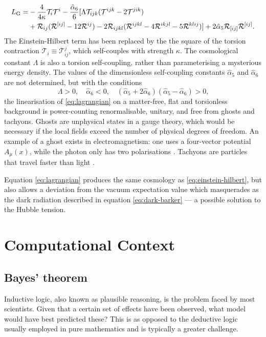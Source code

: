 \documentclass{article}
\begin{document}
\begin{equation}\begin{aligned}
  \label{eq:lagrangian}
  L_\textrm G = & -\frac{4}{4\kappa}\mathcal T_i\mathcal T^i - \frac{\hat{\alpha}_6}{6} [\Lambda\mathcal T_{ijk}(\mathcal T^{ijk}-2\mathcal T^{jik}) \\ & + \mathcal R_{ij}(\mathcal R ^{[ij]}-12\mathcal R^{ij}) - 2\mathcal R_{ijkl}(\mathcal R ^{ijkl}-4\mathcal R^{ikjl}-5\mathcal R^{klij})] + 2\hat{\alpha}_5\mathcal R_{[ij]}\mathcal R^{[ij]} \textrm{.}
\end{aligned}\end{equation}
%
The Einstein-Hilbert term has been replaced by the the square of the torsion contraction $\mathcal T_i \equiv \mathcal T^j_{ij}$, which self-couples with strength $\kappa$. The cosmological constant $\Lambda$ is also a torsion self-coupling, rather than parameterising a mysterious energy density. The values of the dimensionless self-coupling constants $\hat\alpha_5$ and $\hat\alpha_6$ are not determined, but with the conditions
\begin{equation}
  \Lambda > 0,\quad \hat\alpha_6<0,\quad (\hat\alpha_5+2\hat\alpha_6)(\hat\alpha_5-\hat\alpha_6) > 0 \textrm{,}
\end{equation}
%
the linearisation of \ref{eq:lagrangian} on a matter-free, flat and torsionless background is power-counting renormalisable, unitary, and free from ghosts and tachyons. Ghosts are unphysical states in a gauge theory, which would be necessary if the local fields exceed the number of physical degrees of freedom. An example of a ghost exists in electromagnetism: one uses a four-vector potential $A_\mu(x)$, while the photon only has two polarisations \cite{Faddeev:2009}. Tachyons are particles that travel faster than light \cite{tachyon}.

Equation \ref{eq:lagrangian} produces the same cosmology as \ref{eq:einstein-hilbert}, but also allows a deviation from the vacuum expectation value which masquerades as the dark radiation described in equation \ref{eq:dark-barker} --- a possible solution to the Hubble tension.


\section{Computational Context}
\subsection{Bayes' theorem}
Inductive logic, also known as plausible reasoning, is the problem faced by most scientists. Given that a certain set of effects have been observed, what model would have best predicted these? This is as opposed to the deductive logic usually employed in pure mathematics and is typically a greater challenge. \cite{skilling}
\end{document}
